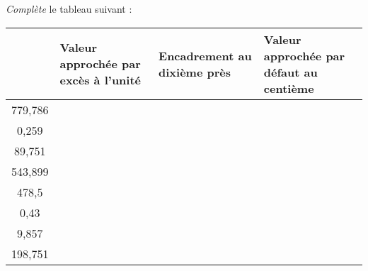 {\em Complète} le tableau suivant :
\begin{center}
\renewcommand{\arraystretch}{1.5}
\begin{tabular}{|c|m{3.5cm}|m{3.5cm}|m{3.5cm}|}
\cline{2-4}
\multicolumn{1}{c|}{}&Valeur approchée par excès à l'unité&Encadrement au dixième près&Valeur
approchée par défaut au centième\\
\hline
779,786&&&\\
\hline
0,259&&&\\
\hline
89,751&&&\\
\hline
543,899&&&\\
\hline
478,5&&&\\
\hline
0,43&&&\\
\hline
9,857&&&\\
\hline
198,751&&&\\
\hline
\end{tabular}
\renewcommand{\arraystretch}{1.5}
\end{center}
